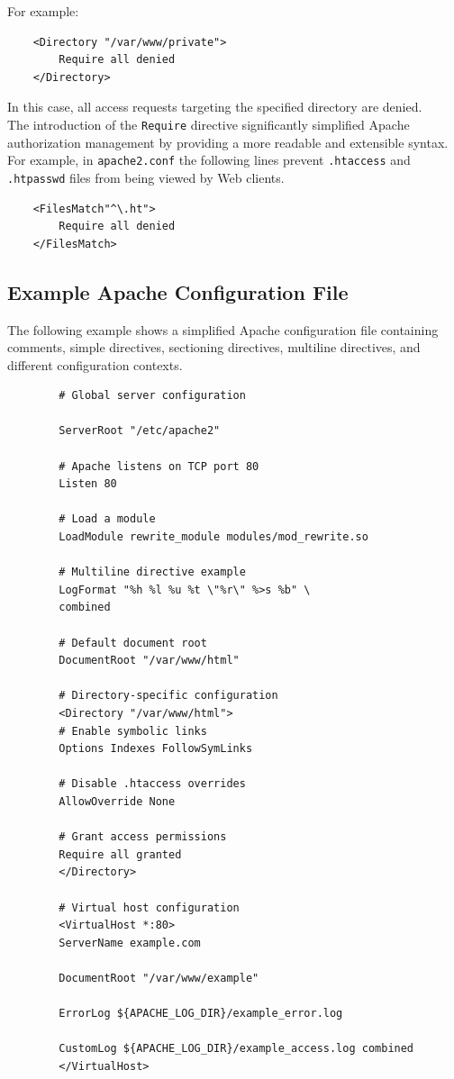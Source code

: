 \documentclass{scrbook}
\begin{document}
	For example:
	
	\begin{lstlisting}
	<Directory "/var/www/private">
		Require all denied
	</Directory>
	\end{lstlisting}
	
	In this case, all access requests targeting the specified directory are denied.\\
	
	The introduction of the \texttt{Require} directive significantly simplified Apache authorization management by providing a more readable and extensible syntax. For example, in \texttt{apache2.conf} the following lines prevent \texttt{.htaccess} and \texttt{.htpasswd} files from being viewed by Web clients.
	
	\begin{lstlisting}
	<FilesMatch"^\.ht">
		Require all denied
	</FilesMatch>
	\end{lstlisting}
	
	\subsection{Example Apache Configuration File}
	
	The following example shows a simplified Apache configuration file containing comments, simple directives, sectioning directives, multiline directives, and different configuration contexts.
	
	\begin{lstlisting}
		# Global server configuration
		
		ServerRoot "/etc/apache2"
		
		# Apache listens on TCP port 80
		Listen 80
		
		# Load a module
		LoadModule rewrite_module modules/mod_rewrite.so
		
		# Multiline directive example
		LogFormat "%h %l %u %t \"%r\" %>s %b" \
		combined
		
		# Default document root
		DocumentRoot "/var/www/html"
		
		# Directory-specific configuration
		<Directory "/var/www/html">
		# Enable symbolic links
		Options Indexes FollowSymLinks
		
		# Disable .htaccess overrides
		AllowOverride None
		
		# Grant access permissions
		Require all granted
		</Directory>
		
		# Virtual host configuration
		<VirtualHost *:80>
		ServerName example.com
		
		DocumentRoot "/var/www/example"
		
		ErrorLog ${APACHE_LOG_DIR}/example_error.log
		
		CustomLog ${APACHE_LOG_DIR}/example_access.log combined
		</VirtualHost>
	\end{lstlisting}
	
\end{document}
